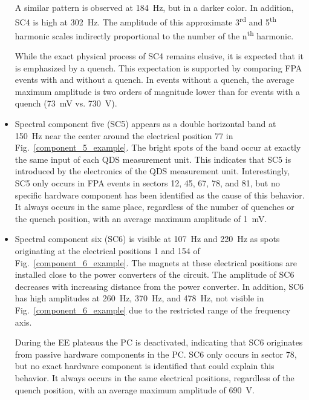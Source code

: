 \documentclass[lettersize,journal]{IEEEtran}
\begin{document}
\begin{itemize}
    A similar pattern is observed at 184~Hz, but in a darker color. 
    In addition, SC4 is high at 302~Hz.
    The amplitude of this approximate 3\textsuperscript{rd} and 5\textsuperscript{th} harmonic scales indirectly proportional to the number of the n\textsuperscript{th} harmonic.
    
    While the exact physical process of SC4 remains elusive, it is expected that it is emphasized by a quench.
    This expectation is supported by comparing FPA events with and without a quench.
    In events without a quench, the average maximum amplitude is two orders of magnitude lower than for events with a quench (73~mV vs. 730~\textmu V).

    \item Spectral component five (SC5) appears as a double horizontal band at 150~Hz near the center around the electrical position 77 in Fig.~\ref{component_5_example}. 
    The bright spots of the band occur at exactly the same input of each QDS measurement unit.
    This indicates that SC5 is introduced by the electronics of the QDS measurement unit.
    Interestingly, SC5 only occurs in FPA events in sectors 12, 45, 67, 78, and 81, but no specific hardware component has been identified as the cause of this behavior.
    It always occurs in the same place, regardless of the number of quenches or the quench position, with an average maximum amplitude of 1~mV.
    
    \item Spectral component six (SC6) is visible at 107~Hz and 220~Hz as spots 
    originating at the electrical positions 1 and 154 of Fig.~\ref{component_6_example}.
    The magnets at these electrical positions are installed close to the power converters of the circuit. 
    The amplitude of SC6 decreases with increasing distance from the power converter.
    In addition, SC6 has high amplitudes at 260~Hz, 370~Hz, and 478~Hz, not visible in Fig.~\ref{component_6_example} due to the restricted range of the frequency axis.
    
    During the EE plateaus the PC is deactivated, indicating that SC6 originates from passive hardware components in the PC.
    SC6 only occurs in sector 78, but no exact hardware component is identified that could explain this behavior.
    It always occurs in the same electrical positions, regardless of the quench position, with an average maximum amplitude of 690~\textmu V.
    

\end{itemize}
\end{document}
